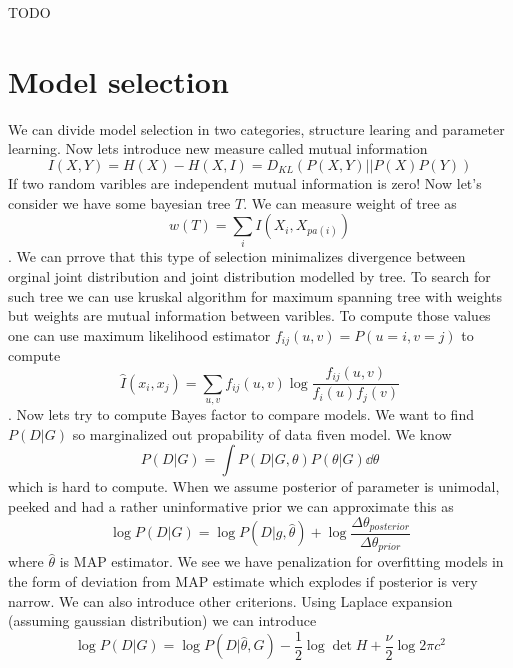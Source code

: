 \documentclass[12pt,a4paper]{article}
\begin{document}
TODO

\section{Model selection}
We can divide model selection in two categories, structure learing and parameter learning. Now lets introduce new measure called mutual information
\begin{equation*}
    I(X,Y)=H(X)-H(X,I)=D_{KL}(P(X,Y)||P(X)P(Y))
\end{equation*}
If two random varibles are independent mutual information is zero! Now let's consider we have some bayesian tree $T$. We can measure weight of tree as
\begin{equation*}
    w(T)=\sum_i I(X_i,X_{pa(i)})
\end{equation*}
. We can prrove that this type of selection minimalizes divergence between orginal joint distribution and joint distribution modelled by tree. To search for such tree
we can use kruskal algorithm for maximum spanning tree with weights but weights are mutual information between varibles. To compute those values one can use maximum likelihood
estimator $f_{ij}(u,v)=P(u=i,v=j)$ to compute
\begin{equation*}
    \hat{I}(x_i,x_j)=\sum_{u,v}f_{ij}(u,v)\log{\frac{f_{ij}(u,v)}{f_i(u)f_j(v)}}
\end{equation*}. Now lets try to compute Bayes factor to compare models. We want to find $P(D|G)$ so marginalized out propability of data fiven model. We know
\begin{equation*}
    P(D|G)=\int P(D|G,\theta)P(\theta|G)\dd \theta
\end{equation*} which is hard to compute. When we assume posterior of parameter is unimodal, peeked and had a rather uninformative prior we can approximate this as
\begin{equation*}
    \log{P(D|G)}=\log{P(D|g,\hat{\theta})}+\log{\frac{\Delta \theta_{posterior}}{\Delta \theta_{prior}}}
\end{equation*} where $\hat{\theta}$ is MAP estimator. We see we have penalization for overfitting models in the form of deviation from MAP estimate which explodes if posterior
is very narrow. We can also introduce other criterions. Using Laplace expansion (assuming gaussian distribution) we can introduce
\begin{equation*}
    \log{P(D|G)}=\log{P(D|\hat{\theta},G)}-\frac{1}{2}\log{\det{H}}+\frac{\nu}{2}\log{2\pi c^2}
\end{equation*}
\end{document}
